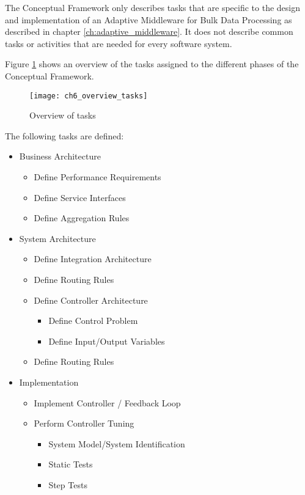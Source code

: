 The Conceptual Framework only describes tasks that are specific to the design and implementation of an Adaptive Middleware for Bulk Data Processing as described in chapter \ref{ch:adaptive_middleware}. It does not describe common tasks or activities that are needed for every software system.

Figure \ref{fig:ch6_overview_tasks} shows an overview of the tasks assigned to the different phases of the Conceptual Framework.

\begin{figure}[htpb] \centering 
	\texttt{[image: ch6\_overview\_tasks]} 
	\caption{Overview of tasks} 
	\label{fig:ch6_overview_tasks} 
\end{figure}

The following tasks are defined:

\begin{itemize}
	\item Business Architecture
	\begin{itemize}
		\item Define Performance Requirements
		\item Define Service Interfaces
		\item Define Aggregation Rules
	\end{itemize}
	\item System Architecture 
	\begin{itemize}
		\item Define Integration Architecture
		\item Define Routing Rules
		\item Define Controller Architecture 
		\begin{itemize}
			\item Define Control Problem 
			\item Define Input/Output Variables 
		\end{itemize}
		\item Define Routing Rules
	\end{itemize}
	\item Implementation
	\begin{itemize}
		\item Implement Controller / Feedback Loop
		\item Perform Controller Tuning 
		\begin{itemize}
			\item System Model/System Identification 
			\item Static Tests
			\item Step Tests

\end{itemize}
\end{itemize}
\end{itemize}
